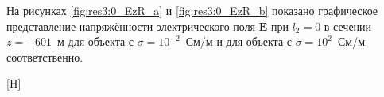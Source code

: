 \documentclass[a4paper,14pt]{article}
\makeatletter
\renewenvironment{figure}[1][\fps@figure]{
  \edef\@tempa{\noexpand\@float{figure}[#1]}
  \@tempa
  \addtocounter{foofigure}{1}
}{
  \end@float
}
\renewcommand{\Re}{\mathop{\mathrm{Re}}\nolimits}
\makeatother
\begin{document}
На рисунках \ref{fig:res3:0_EzR_a} и \ref{fig:res3:0_EzR_b} показано графическое представление напряжённости электрического поля $\mathbf{E}$ при $l_2=0$ в сечении $z=-601$~м для объекта с $\sigma=10^{-2}$~См/м и для объекта с $\sigma=10^{2}$~См/м соответственно.

\begin{figure}[H]
	\centering
	\text{~~}
	\caption{$\Re(\mathbf{E}_z)$ при $l_2=0$}
	\label{fig:res3:0_EzR}
\end{figure}
\end{document}
